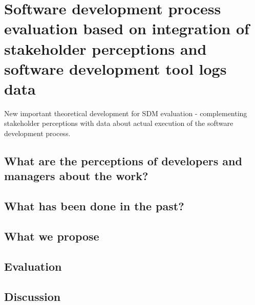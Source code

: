 \chapter{Software development process evaluation based on integration of stakeholder perceptions and software development tool logs data}


New important theoretical development for SDM evaluation - complementing stakeholder perceptions with data about actual execution of the software development process.

\section{What are the perceptions of developers and managers about the work?}

\section{What has been done in the past?}

\section{What we propose}

\section{Evaluation}

\section{Discussion}
